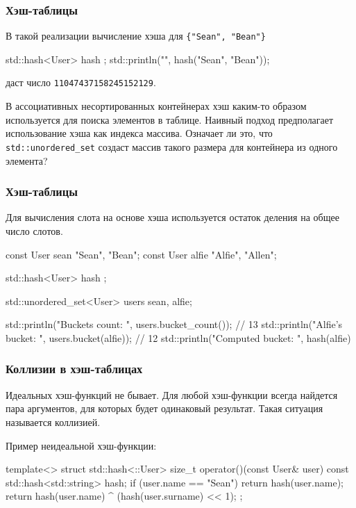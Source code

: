 \documentclass[compress, 8pt, aspectratio=169]{beamer}
\begin{document}
  \begin{frame}[fragile]

    \frametitle{Хэш-таблицы}

    В такой реализации вычисление хэша для \verb|{"Sean", "Bean"}|

    \begin{mycppinplacelisting}
std::hash<User> hash {};
std::println("{}", hash({"Sean", "Bean"}));
    \end{mycppinplacelisting}

    даст число \texttt{11047437158245152129}.

    \hfill \break
    В ассоциативных несортированных контейнерах хэш каким-то образом
    используется для поиска элементов в таблице.
    Наивный подход предполагает использование хэша как индекса массива.
    Означает ли это, что \texttt{std::unordered\_set} создаст
    массив такого размера для контейнера из одного элемента?

  \end{frame}

  \begin{frame}[fragile]

    \frametitle{Хэш-таблицы}

    Для вычисления слота на основе хэша используется
    остаток деления на общее число слотов.

    \begin{mycppinplacelisting}
const User sean {"Sean", "Bean"};
const User alfie {"Alfie", "Allen"};

std::hash<User> hash {};

std::unordered_set<User> users {sean, alfie};

std::println("Buckets count: {}", users.bucket_count()); // 13
std::println("Alfie's bucket: {}", users.bucket(alfie)); // 12
std::println("Computed bucket: {}",
  hash(alfie) %
    \end{mycppinplacelisting}

  \end{frame}

  \begin{frame}[fragile]

    \frametitle{Коллизии в хэш-таблицах}

    Идеальных хэш-функций не бывает.
    Для любой хэш-функции всегда найдется пара аргументов,
    для которых будет одинаковый результат.
    Такая ситуация называется коллизией\footnotemark{}.


    \hfill \break
    Пример неидеальной хэш-функции:

    \begin{mycppinplacelisting}
template<>
struct std::hash<::User> {
    size_t operator()(const User& user) const {
        std::hash<std::string> hash;
        if (user.name == "Sean") {
            return hash(user.name);
        }
        return hash(user.name) ^ (hash(user.surname) << 1);
    }
};
    \end{mycppinplacelisting}

  \end{frame}
\end{document}
